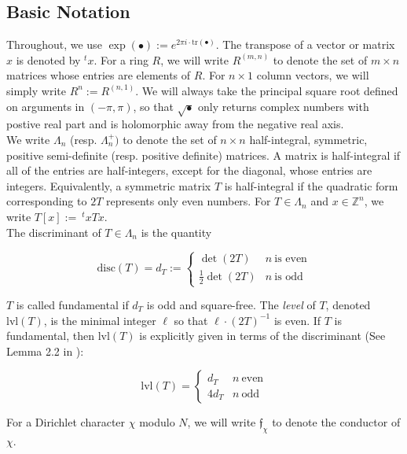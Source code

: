 \documentclass[11pt]{article}
\theoremstyle{definition}
\theoremstyle{remark}
\newcommand{\Z}{\mathbb{Z}}
\newcommand{\tr}{\text{tr}}
\newcommand{\disc}{\text{disc}}
\begin{document}
\subsection{Basic Notation}

Throughout, we use $\exp(\bullet) := e^{2\pi i \cdot \tr(\bullet)}$. The transpose of a vector or matrix $x$ is denoted by $^tx$. For a ring $R$, we will write $R^{(m,n)}$ to denote the set of $m \times n$ matrices whose entries are elements of $R$. For $n \times 1$ column vectors, we will simply write $R^n := R^{(n,1)}$. We will always take the principal square root defined on arguments in $(-\pi,\pi)$, so that $\sqrt{\bullet}$ only returns complex numbers with postive real part and is holomorphic away from the negative real axis. \\

We write $\Lambda_n$ (resp. $\Lambda_n^+)$ to denote the set of $n \times n$ half-integral, symmetric, positive semi-definite (resp. positive definite) matrices. A matrix is half-integral if all of the entries are half-integers, except for the diagonal, whose entries are integers. Equivalently, a symmetric matrix $T$ is half-integral if the quadratic form corresponding to $2T$ represents only even numbers. For $T \in \Lambda_n$ and $x \in \Z^n$, we write $T[x] := \ ^txTx$. \\

The discriminant of $T \in \Lambda_n$ is the quantity 

\[
\disc(T) = d_T := \begin{cases}
    \det(2T) & n \ \text{is even} \\
    \frac{1}{2} \det(2T) & n \ \text{is odd}
\end{cases}
\]

$T$ is called fundamental if $d_T$ is odd and square-free. The \textit{level} of $T$, denoted $\text{lvl}(T)$, is the minimal integer $\ell$ so that $\ell \cdot (2T)^{-1}$ is even. If $T$ is fundamental, then $\mathrm{lvl}(T)$ is explicitly given in terms of the discriminant (See Lemma 2.2 in \cite{BD}): 

\begin{equation} \label{level of T}
    \mathrm{lvl}(T) = \begin{cases}
        d_T & n \ \mathrm{even} \\
        4d_T & n \ \mathrm{odd}
    \end{cases}
\end{equation}

For a Dirichlet character $\chi$ modulo $N$, we will write $\mathfrak{f}_\chi$ to denote the conductor of $\chi$. \\
\end{document}
